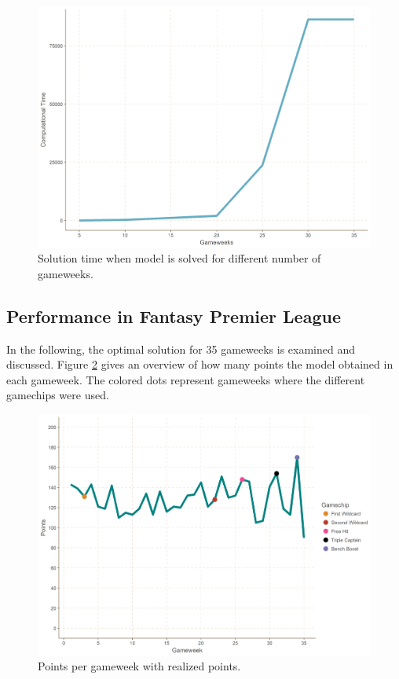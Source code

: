 \begin{figure}[!htbp]
    \centering
    \includegraphics[scale=0.35]{fig/chapter_7/comp_time.png}
    \caption{Solution time when model is solved for different number of gameweeks.}
    \label{fig:comp_time_diff_gameweeks}   
\end{figure}

\newpage

\subsection{Performance in Fantasy Premier League}

In the following, the optimal solution for 35 gameweeks is examined and discussed. Figure \ref{Figure_Realized_points} gives an overview of how many points the model obtained in each gameweek. The colored dots represent gameweeks where the different gamechips were used.

\newpar

\begin{figure}[H]
    \centering
    \includegraphics[scale=0.45]{fig/chapter_7/perf_gc.png}
    \caption{Points per gameweek with realized points.}
\label{Figure_Realized_points}    
\end{figure}

